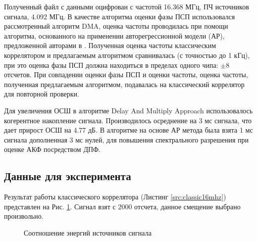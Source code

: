 Полученный файл с данными оцифрован с частотой 16.368 МГц, ПЧ источников сигнала, 4.092 МГц. В качестве алгоритма оценки фазы ПСП использовался рассмотренный алгоритм DMA,
оценка частоты проводилась при помощи алгоритма, основанного на применении авторегрессионной модели (АР), предложенной авторами в \cite{my_otchet}. Полученная оценка
частоты классическим коррелятором и предлагаемым алгоритмом сравнивалась (с точностью до 1 кГц), при это оценка фазы ПСП должна находиться в пределах одного чипа: ${\pm 8}$
отсчетов. При совпадении оценки фазы ПСП и оценки частоты, оценка частоты, полученная предлагаемым алгоритмом, подавалась на классический коррелятор для повторной проверки.

Для увеличения ОСШ в алгоритме Delay And Multiply Approach использовалось когерентное накопление сигнала. Производилось осреднение на 3 мс сигнала, что дает прирост ОСШ на 4.77 дБ.
В алгоритме на основе АР метода была взята 1 мс сигнала дополненная 3 мс нулей, для повышения спектрального разрешения при оценке АКФ посредством ДПФ.

\subsection{Данные для эксперимента}

Результат работы классического коррелятора (Листинг \ref{src:classic16mhz}) представлен на Рис. \ref{pic:16mhz_sats_all}.
Сигнал взят с 2000 отсчета, данное смещение выбрано произвольно.
\begin{figure}[h]
\center{}
	\caption{Соотношение энергий источников сигнала}
	\label{pic:16mhz_sats_all}
\end{figure}

